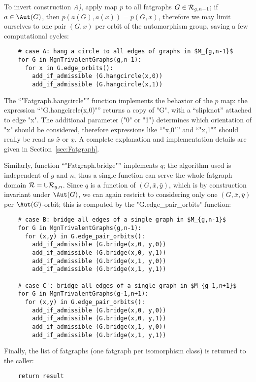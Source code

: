 To invert construction {\slshape A)}, apply map $p$ to all fatgraphs $G \in
\mathcal{R}_{g,n-1}$; if $a \in \Aut(G)$, then $p(a(G), a(x)) = p(G, x)$,
therefore we may limit ourselves to one pair $(G,x)$ per orbit of the
automorphism group, saving a few computational cycles:
\begin{lstlisting}
    # case A: hang a circle to all edges of graphs in $M_{g,n-1}$
    for G in MgnTrivalentGraphs(g,n-1):
      for x in G.edge_orbits():
        add_if_admissible (G.hangcircle(x,0))
        add_if_admissible (G.hangcircle(x,1))

\end{lstlisting}
The ``"Fatgraph.hangcircle"'' function implements the behavior of the
$p$ map: the expression ``"G.hangcircle(x,0)"'' returns a copy of
"G", with a ``slipknot'' attached to edge "x".  The additional
parameter ("0" or "1") determines which orientation of "x"
should be considered, therefore expressions like ``"x,0"'' and
``"x,1"'' should really be read as $\bar{x}$ or $\underline{x}$. A
complete explanation and implementation details are given in
Section~\ref{sec:Fatgraph}.

Similarly, function ``"Fatgraph.bridge"'' implements $q$;
the algorithm used is independent of $g$ and $n$, thus a single
function can serve the whole fatgraph domain $\mathcal{R} = \cup
\mathcal{R}_{g,n}$. Since $q$ is a function of $(G, \bar{x}, \bar{y})$, which
is by construction invariant under $\Aut(G)$, we can again restrict
to considering only one $(G, \bar{x}, \bar{y})$ per $\Aut(G)$-orbit;
this is computed by the "G.edge_pair_orbits" function:
\begin{lstlisting}
    # case B: bridge all edges of a single graph in $M_{g,n-1}$
    for G in MgnTrivalentGraphs(g,n-1):
      for (x,y) in G.edge_pair_orbits():
        add_if_admissible (G.bridge(x,0, y,0))
        add_if_admissible (G.bridge(x,0, y,1))
        add_if_admissible (G.bridge(x,1, y,0))
        add_if_admissible (G.bridge(x,1, y,1))

    # case C': bridge all edges of a single graph in $M_{g-1,n+1}$
    for G in MgnTrivalentGraphs(g-1,n+1):
      for (x,y) in G.edge_pair_orbits():
        add_if_admissible (G.bridge(x,0, y,0))
        add_if_admissible (G.bridge(x,0, y,1))
        add_if_admissible (G.bridge(x,1, y,0))
        add_if_admissible (G.bridge(x,1, y,1))

\end{lstlisting}

Finally, the list of fatgraphs (one fatgraph per isomorphism class) is
returned to the caller:
\begin{lstlisting}
    return result
\end{lstlisting}


